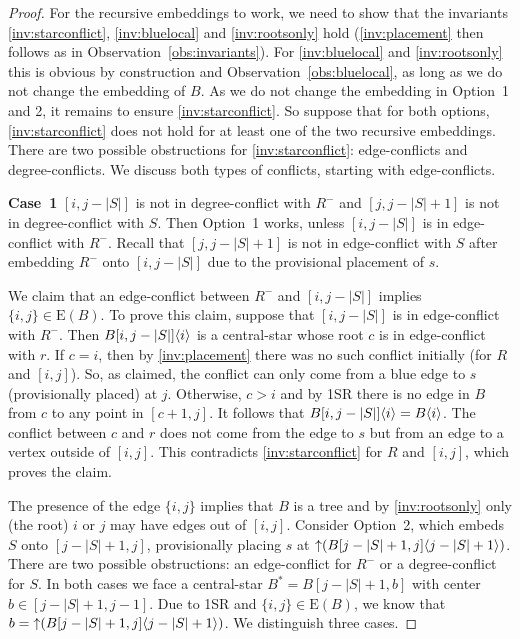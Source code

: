 \documentclass[11pt,a4paper,colorlinks=true,urlcolor=blue,citecolor=red]{article}
\theoremstyle{plain}
\newcommand{\case}[1]{\par\vspace{.5\baselineskip}\noindent\textbf{\sffamily Case~#1}}
\newcommand{\EB}{\mathrm{E}(B)}
\begin{document}
\begin{proof}
  For the recursive embeddings to work, we need to show that the
  invariants \ref{inv:starconflict}, \ref{inv:bluelocal} and
  \ref{inv:rootsonly} hold (\ref{inv:placement} then follows as in
  Observation~\ref{obs:invariants}). For \ref{inv:bluelocal} and
  \ref{inv:rootsonly} this is obvious by construction and
  Observation~\ref{obs:bluelocal}, as long as we do not change the
  embedding of $B$. As we do not change the embedding in Option~1 and 2,
  it remains to ensure \ref{inv:starconflict}. So suppose that for both
  options, \ref{inv:starconflict} does not hold for at least one of the
  two recursive embeddings. There are two possible obstructions for
  \ref{inv:starconflict}: edge-conflicts and degree-conflicts. We
  discuss both types of conflicts, starting with edge-conflicts.

  \case{1} $[i,j-|S|]$ is not in degree-conflict with $R^-$ and
  $[j,j-|S|+1]$ is not in degree-conflict with $S$. Then Option~1 works,
  unless $[i,j-|S|]$ is in edge-conflict with $R^-$. Recall that
  $[j,j-|S|+1]$ is not in edge-conflict with $S$ after embedding $R^-$
  onto $[i,j-|S|]$ due to the provisional placement of $s$.


  We claim that an edge-conflict between $R^-$ and $[i,j-|S|]$ implies
  $\{i,j\}\in\EB$. To prove this claim, suppose that $[i,j-|S|]$ is in
  edge-conflict with $R^-$. Then $B{[i,j-|S|]}\langle{i}\rangle$ is a
  central-star whose root $c$ is in edge-conflict with $r$. If $c=i$,
  then by \ref{inv:placement} there was no such conflict initially (for
  $R$ and $[i,j]$). So, as claimed, the conflict can only come from a
  blue edge to $s$ (provisionally placed) at $j$. Otherwise, $c>i$ and
  by 1SR there is no edge in $B$ from $c$ to any point in $[c+1,j]$. It
  follows that $B{[i,j-|S|]}\langle{i}\rangle=B\langle{i}\rangle$. The conflict between
  $c$ and $r$ does not come from the edge to $s$ but from an edge to a
  vertex outside of $[i,j]$. This contradicts \ref{inv:starconflict} for
  $R$ and $[i,j]$, which proves the claim.

  The presence of the edge $\{i,j\}$ implies that $B$ is a tree and by
  \ref{inv:rootsonly} only (the root) $i$ or $j$ may have edges out of
  $[i,j]$. Consider Option~2, which embeds $S$ onto $[j-|S|+1,j]$,
  provisionally placing $s$ at
  $\mathop{\uparrow}(B{[j-|S|+1,j]}\langle{j-|S|+1}\rangle)$.  There are two possible
  obstructions: an edge-conflict for $R^-$ or a degree-conflict for
  $S$. In both cases we face a central-star $B^*=B[j-|S|+1,b]$ with
  center $b\in[j-|S|+1,j-1]$. Due to 1SR and $\{i,j\}\in\EB$, we know
  that $b=\mathop{\uparrow}(B{[j-|S|+1,j]}\langle{j-|S|+1}\rangle)$. We distinguish three
  cases.


\end{proof}
\end{document}
